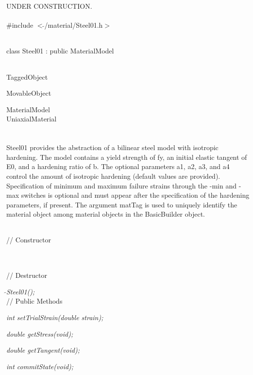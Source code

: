 
UNDER CONSTRUCTION. \\

   \\
\#include $<\tilde{ }$/material/Steel01.h$>$  


  \\
class Steel01 : public MaterialModel 


 \\
TaggedObject 

MovableObject 

\indent\indent MaterialModel \\
\indent\indent\indent UniaxialMaterial \\
\indent\indent\indent{} \\

  \\
\indent Steel01 provides the abstraction of a bilinear steel model
with isotropic hardening. The model contains a yield strength of fy,
an initial elastic tangent of E0, and a hardening ratio of b. The
optional parameters a1, a2, a3, and a4 control the amount of isotropic
hardening (default values are provided). Specification of minimum and
maximum failure strains through the -min and -max switches is optional
and must appear after the specification of the hardening parameters,
if present. The argument matTag is used to uniquely identify the
material object among material objects in the BasicBuilder object. 


 \\
// Constructor 

  \\ \\
// Destructor 

{\em $\tilde{ }$Steel01();}\\ 

// Public Methods 

{\em int setTrialStrain(double strain); } 

{\em double getStress(void); } 

{\em double getTangent(void); } 

{\em int commitState(void); } 


